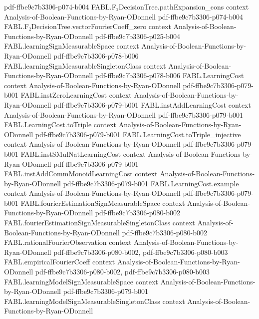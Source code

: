 \begin{theorem}
  {pdf-ffbe9c7b3306-p074-b004}
\proofstep
  {FABL.F₂DecisionTree.pathExpansion_cons}
  {context}
  {Analysis-of-Boolean-Functions-by-Ryan-ODonnell}
  {pdf-ffbe9c7b3306-p074-b004}
\proofstep
  {FABL.F₂DecisionTree.vectorFourierCoeff_zero}
  {context}
  {Analysis-of-Boolean-Functions-by-Ryan-ODonnell}
  {pdf-ffbe9c7b3306-p025-b004}
\proofstep
  {FABL.learningSignMeasurableSpace}
  {context}
  {Analysis-of-Boolean-Functions-by-Ryan-ODonnell}
  {pdf-ffbe9c7b3306-p078-b006}
\proofstep
  {FABL.learningSignMeasurableSingletonClass}
  {context}
  {Analysis-of-Boolean-Functions-by-Ryan-ODonnell}
  {pdf-ffbe9c7b3306-p078-b006}
\proofstep
  {FABL.LearningCost}
  {context}
  {Analysis-of-Boolean-Functions-by-Ryan-ODonnell}
  {pdf-ffbe9c7b3306-p079-b001}
\proofstep
  {FABL.instZeroLearningCost}
  {context}
  {Analysis-of-Boolean-Functions-by-Ryan-ODonnell}
  {pdf-ffbe9c7b3306-p079-b001}
\proofstep
  {FABL.instAddLearningCost}
  {context}
  {Analysis-of-Boolean-Functions-by-Ryan-ODonnell}
  {pdf-ffbe9c7b3306-p079-b001}
\proofstep
  {FABL.LearningCost.toTriple}
  {context}
  {Analysis-of-Boolean-Functions-by-Ryan-ODonnell}
  {pdf-ffbe9c7b3306-p079-b001}
\proofstep
  {FABL.LearningCost.toTriple_injective}
  {context}
  {Analysis-of-Boolean-Functions-by-Ryan-ODonnell}
  {pdf-ffbe9c7b3306-p079-b001}
\proofstep
  {FABL.instSMulNatLearningCost}
  {context}
  {Analysis-of-Boolean-Functions-by-Ryan-ODonnell}
  {pdf-ffbe9c7b3306-p079-b001}
\proofstep
  {FABL.instAddCommMonoidLearningCost}
  {context}
  {Analysis-of-Boolean-Functions-by-Ryan-ODonnell}
  {pdf-ffbe9c7b3306-p079-b001}
\proofstep
  {FABL.LearningCost.example}
  {context}
  {Analysis-of-Boolean-Functions-by-Ryan-ODonnell}
  {pdf-ffbe9c7b3306-p079-b001}
\proofstep
  {FABL.fourierEstimationSignMeasurableSpace}
  {context}
  {Analysis-of-Boolean-Functions-by-Ryan-ODonnell}
  {pdf-ffbe9c7b3306-p080-b002}
\proofstep
  {FABL.fourierEstimationSignMeasurableSingletonClass}
  {context}
  {Analysis-of-Boolean-Functions-by-Ryan-ODonnell}
  {pdf-ffbe9c7b3306-p080-b002}
\proofstep
  {FABL.rationalFourierObservation}
  {context}
  {Analysis-of-Boolean-Functions-by-Ryan-ODonnell}
  {pdf-ffbe9c7b3306-p080-b002,
    pdf-ffbe9c7b3306-p080-b003}
\proofstep
  {FABL.empiricalFourierCoeff}
  {context}
  {Analysis-of-Boolean-Functions-by-Ryan-ODonnell}
  {pdf-ffbe9c7b3306-p080-b002,
    pdf-ffbe9c7b3306-p080-b003}
\proofstep
  {FABL.learningModelSignMeasurableSpace}
  {context}
  {Analysis-of-Boolean-Functions-by-Ryan-ODonnell}
  {pdf-ffbe9c7b3306-p079-b001}
\proofstep
  {FABL.learningModelSignMeasurableSingletonClass}
  {context}
  {Analysis-of-Boolean-Functions-by-Ryan-ODonnell}

\end{theorem}
